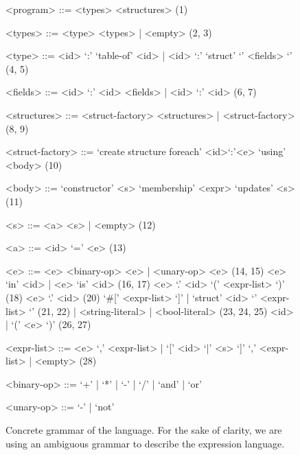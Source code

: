 {
\scriptsize
\begin{figure}[!ht]
\begin{mdframed}[outermargin=0.2cm, innermargin=0.5cm]

\newcommand{\grule}[1]{\hfill{\scriptsize (#1)}}
\setlength{\grammarindent}{5em}
\begin{grammar}

<program> ::= <types> <structures> \grule{1}

<types> ::= <type> <types> | <empty> \grule{2, 3}

<type> ::= <id> `:' `table-of' <id> | <id> `:' `struct' `{' <fields> `}' \grule{4, 5}

<fields> ::= <id> `:' <id> <fields> | <id> `:' <id> \grule{6, 7}

<structures> ::= <struct-factory> <structures> | <struct-factory> \grule{8, 9}

<struct-factory> ::= `create structure foreach' <id>`:'<e> `using' <body> \grule{10}


<body> ::= `constructor' <s> `membership' <expr> `updates' <s> \grule{11}




<s> ::= <a> <s> | <empty> \grule{12}

<a> ::= <id> `=' <e>  \grule{13} 

<e> ::= <e> <binary-op> <e> | <unary-op> <e> \grule{14, 15}
\alt <e> `in' <id> | <e> `is' <id> \grule{16, 17}
\alt <e> `.' <id> `(' <expr-list> `)' \grule{18}
\alt <e> `.' <id>                              \grule{20}
\alt `#[' <expr-list> `]' | `struct' <id> `{' <expr-list> `}' \grule{21, 22}
 | <string-literal> | <bool-literal> \grule{23, 24, 25}
\alt <id> | `(' <e> `)' \grule{26, 27}

<expr-list> ::= <e> `,' <expr-list> | `[' <id> `|' <s> `]' `,' <expr-list> | <empty>  \grule{28}

<binary-op> ::= `+' | `*' | `-' | `/' | `and' | `or'

<unary-op> ::= `-' | `not'

\end{grammar}
\end{mdframed}
\caption{Concrete grammar of the language. For the sake of clarity, we are using an ambiguous grammar to describe the expression language.} \label{fig:dsl-grammar}
\end{figure}
}

